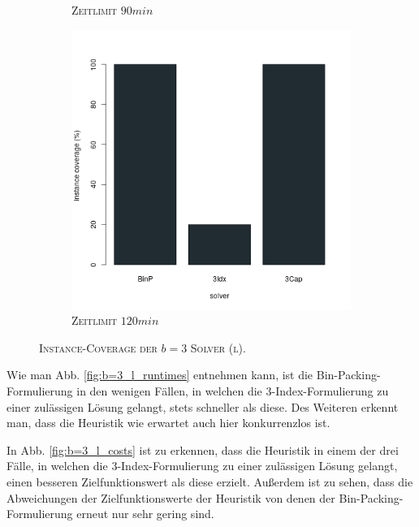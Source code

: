 \begin{figure}[H]
\begin{subfigure}[b]{0.3\textwidth}
\caption{\textsc{Zeitlimit} $90min$}
\label{fig:instance_coverage_b=3_l_b}
\end{subfigure}
\hfill
\begin{subfigure}[b]{0.3\textwidth}
\centering
\includegraphics[width=1.2\textwidth]{img/solver_instance_coverage_b=3_l_7200s.png}
\caption{\textsc{Zeitlimit} $120min$}
\label{fig:instance_coverage_b=3_l_c}
\end{subfigure}
\caption{\textsc{Instance-Coverage der $b = 3$ Solver (l)}.}
\label{}
\end{figure}

Wie man Abb. \ref{fig:b=3_l_runtimes} entnehmen kann, ist die Bin-Packing-Formulierung in den wenigen
Fällen, in welchen die 3-Index-Formulierung zu einer zulässigen Lösung gelangt, stets schneller
als diese. Des Weiteren erkennt man, dass die Heuristik wie erwartet auch hier konkurrenzlos ist.

In Abb. \ref{fig:b=3_l_costs} ist zu erkennen, dass die Heuristik in einem der drei Fälle, in welchen die
3-Index-Formulierung zu einer zulässigen Lösung gelangt, einen besseren Zielfunktionswert als diese erzielt.
Außerdem ist zu sehen, dass die Abweichungen der Zielfunktionswerte der Heuristik von denen der Bin-Packing-Formulierung
erneut nur sehr gering sind.

